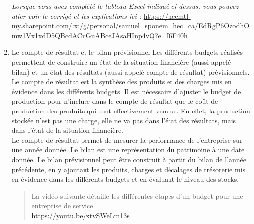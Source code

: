 \documentclass{tufte-handout}
\begin{document}
\begin{enumerate}
\emph{Lorsque vous avez complété le tableau Excel indiqué ci-dessus, vous pouvez aller voir le corrigé et les explications ici :} \url{https://hecmtl-my.sharepoint.com/:x:/g/personal/samuel\_sponem\_hec\_ca/EdRgP6OzodhOmw1Vx1xdD5QBcdACuGuABceJAsaHInp4vQ?e=I6F40h}\\

\item Le compte de résultat et le bilan prévisionnel
\label{sec:org71e020c}
Les différents budgets réalisés permettent de construire un état de la situation financière (aussi appelé bilan) et un état des résultats (aussi appelé compte de résultat) prévisionnels. Le compte de résultat est la synthèse des produits et des charges mis en évidence dans les différents budgets. Il est nécessaire d'ajuster le budget de production pour n'inclure dans le compte de résultat que le coût de production des produits qui sont effectivement vendus. En effet, la production stockée n'est pas une charge, elle ne va pas dans l'état des résultats, mais dans l'état de la situation financière.\\
Le compte de résultat permet de mesurer la performance de l'entreprise sur une année donnée. Le bilan est une représentation du patrimoine à une date donnée. Le bilan prévisionnel peut être construit à partir du bilan de l'année précédente, en y ajoutant les produits, charges et décalages de trésorerie mis en évidence dans les différents budgets et en évaluant le niveau des stocks.\\
\begin{quote}
La vidéo suivante détaille les différentes étapes d'un budget pour une entreprise de service.\\
\url{https://youtu.be/xtvSWeLm13s}\\
\end{quote}
\end{enumerate}
\end{document}
